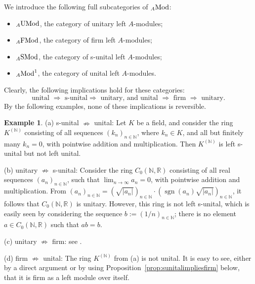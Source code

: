 \documentclass[12pt]{amsart}
\theoremstyle{definition}
\newtheorem{exa}[thm]{Example}
\newcommand{\N}{\mathbb{N}}
\newcommand{\Mod}{{\rm Mod}}
\newcommand{\FMod}{{\rm FMod}}
\newcommand{\SMod}{{\rm SMod}}
\newcommand{\UMod}{{\rm UMod}}
\begin{document}
We introduce the following full subcategories of \({}_A \Mod\):
\begin{itemize}

\item \({}_A \UMod\), the category of unitary left \(A\)-modules;

\item \({}_A \FMod\), the category of firm left \(A\)-modules;

\item \({}_A \SMod\), the category of s-unital left \(A\)-modules;

\item \({}_A \Mod^1\), the category of 
unital left \(A\)-modules.

\end{itemize}

Clearly, the following implications hold
for these categories:
\begin{equation}\label{eq:implications}
\mbox{unital $\Longrightarrow$ s-unital
$\Longrightarrow$ unitary, \ \ and \ \ 
unital $\Longrightarrow$ firm 
$\Longrightarrow$ unitary.} 
\end{equation} 
By the following examples, none of these implications is reversible.

\begin{exa}\label{ex:examplesrings}
(a) s-unital $\nRightarrow$ unital:
Let \( K \) be a field, and 
consider the ring $K^{(\N)}$ consisting of 
all sequences $(k_n)_{n \in \N}$, where 
$k_n \in K$, and all but finitely many
$k_n = 0$, 
with pointwise addition and multiplication.
Then $K^{(\N)}$ is left s-unital but
not left unital. 

(b) unitary $\nRightarrow$ s-unital:
Consider the ring $C_0(\N,\mathbb{R})$
consisting of all real sequences 
$(a_n)_{n\in\N}$, such that 
$\lim_{n \to \infty} a_n = 0$, 
with pointwise addition and multiplication.
From 
$(a_n)_{n \in \N} =
(\sqrt{|a_n|})_{n \in \N} \cdot 
(\operatorname{sgn}(a_n)
\sqrt{|a_n|})_{n \in \N}$, it follows that
$C_0(\N,\mathbb{R})$ is unitary.
However, this ring is not left s-unital,
which is easily seen by considering the
sequence $b := (1/n)_{n \in \N}$;
there is no element 
$a \in C_0(\N,\mathbb{R})$ such that $ab = b$.

(c) unitary $\nRightarrow$ firm: see 
\cite[Example 1.2]{caenepeel1998}.

(d) firm $\nRightarrow$ unital:
The ring $K^{(\N)}$ from (a) is not 
unital. 
It is easy to see, either by a direct argument or by using Proposition~\ref{prop:sunitalimpliesfirm} below, that it is firm as a left module over itself.
\end{exa}
\end{document}
